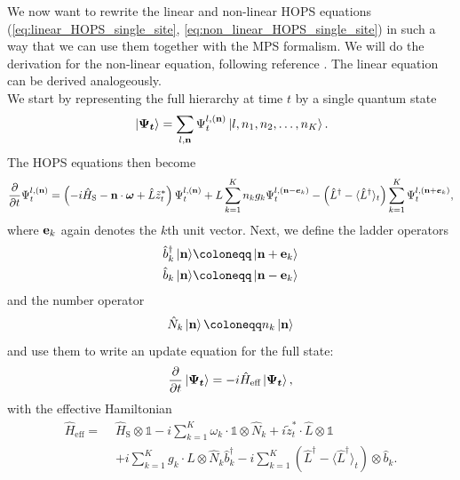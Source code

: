 We now want to rewrite the linear and non-linear HOPS equations (\ref{eq:linear_HOPS_single_site}, \ref{eq:non_linear_HOPS_single_site}) 
in such a way that we can use them together with the MPS formalism. We will do the derivation for the non-linear
equation, following reference \cite{Gao:2022}. The linear equation can be derived analogeously.
\\
We start by representing the full hierarchy at time $t$ by a single quantum state
\begin{equation}
    \label{eq:full_HOPS_state_non_mps}
        \ket*{\vb*{\Psi_t}} = \sum_{l, \vb{n}} \Psi_t^{l,(\vb{n})} \ket*{l, n_1, n_2, \dots, n_{K}}.
\end{equation}
The HOPS equations then become
\begin{equation*}
    \frac{\partial}{\partial t}\Psi_t^{l,(\vb{n})} = \left(
        -i\hat{H}_\text{S} - \vectorbold{n}\cdot\boldsymbol{\omega} + \hat{L}\tilde{z}_t^*
    \right) \Psi_t^{l,(\vb{n})}
    + L\sum_{k=1}^{K}n_kg_k\Psi_t^{l,(\vb{n}-\vb*{e}_k)}
    - \left(
        \hat{L}^\dagger - \langle
        \hat{L}^\dagger
    \rangle_t
    \right)\sum_{k=1}^{K}\Psi_t^{l,(\vb{n}+\vb*{e}_k)},
\end{equation*}
where $\vb{e}_k$ again denotes the $k$th unit vector. Next, we define the ladder operators
\begin{equation*}
    \begin{split}
        \hat{b}_k^\dagger \ket*{\vb{n}} &\coloneqq \ket*{\vb{n} + \vb{e}_k} \\
        \hat{b}_k \ket*{\vb{n}} &\coloneqq \ket*{\vb{n} - \vb{e}_k}
    \end{split}
\end{equation*}
and the number operator
\begin{equation*}
    \hat{N}_k \ket*{\vb{n}} \coloneqq n_k \ket*{\vb{n}}
\end{equation*}
and use them to write an update equation for the full state:
\begin{equation*}
    \frac{\partial}{\partial t}\ket*{\vb*{\Psi_t}} = -i\hat{H}_\text{eff} \ket*{\vb*{\Psi_t}},
\end{equation*}
with the effective Hamiltonian
\begin{equation}
    \label{eq:effective_HOPS_Hamiltonian_multiple_bath_modes}
    \begin{split}
        \hat{H}_\text{eff} = \,\,&\hat{H}_\text{S} \otimes \mathbb{1} - i\sum_{k=1}^{K} \omega_k \cdot \mathbb{1} \otimes \hat{N}_k + i\tilde{z}_t^*\cdot\hat{L} \otimes \mathbb{1}\\
        &+ i\sum_{k=1}^{K} g_k \cdot \hat{L} \otimes \hat{N}_k\hat{b}^\dagger_k - i\sum_{k=1}^{K} \left(\hat{L}^\dagger - \langle\hat{L}^\dagger\rangle_t\right) \otimes \hat{b}_k.
    \end{split}
\end{equation}
